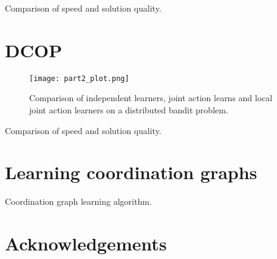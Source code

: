 \documentclass[a4paper, 12pt]{article}
\begin{document}
\begin{table*}[tp]
  \centering
  
  \caption{Comparison of speed and solution quality.}
  \label{tab:part1}
\end{table*}


\section{DCOP}

\begin{figure*}[tp]
  \centering
  \texttt{[image: part2\_plot.png]}
  \caption{Comparison of independent learners, joint action learns and local joint action learners on a distributed bandit problem.}
  \label{fig:part2}
\end{figure*}

\begin{table*}[tp]
  \centering
  
  \caption{Comparison of speed and solution quality.}
  \label{tab:part2}
\end{table*}

\section{Learning coordination graphs}

\begin{algorithm}[tph]
  \caption{Coordination graph learning algorithm.}
  \label{alg:LCG}
  \begin{algorithmic}
    
    \EndFunction
  \end{algorithmic}
\end{algorithm}





\section{Acknowledgements}

\footnotesize


\end{document}
